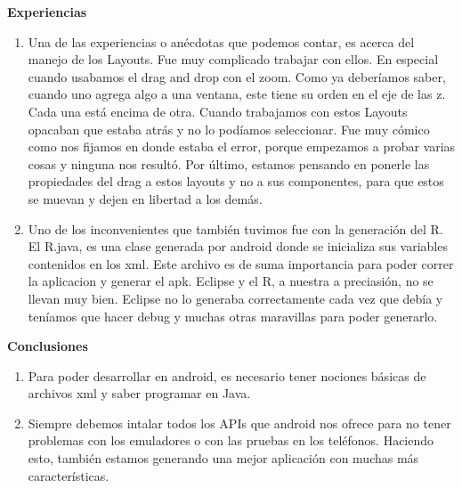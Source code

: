 \documentclass[12pt]{report}
\begin{document}
	\vspace{4em}
	
	\begingroup
		\large{
			\textbf{
				Experiencias
				\newline
				\newline
			}
		}
	\endgroup

		\begin{enumerate}[--]%
		\item Una de las experiencias o anécdotas que podemos contar, es acerca del manejo de los Layouts. Fue muy complicado trabajar con ellos. En especial cuando usabamos el drag and drop con el zoom. \newline
\newline Como ya deberíamos saber, cuando uno agrega algo a una ventana, este tiene su orden en el eje de las z. Cada una está encima de otra. Cuando trabajamos con estos Layouts opacaban que estaba atrás y no lo podíamos seleccionar. Fue muy cómico como nos fijamos en donde estaba el error, porque empezamos a probar varias cosas y ninguna nos resultó.
Por último, estamos pensando en ponerle las propiedades del drag a estos layouts y no a sus componentes, para que estos se muevan y dejen en libertad a los demás.
		\item Uno de los inconvenientes que también tuvimos fue con la generación del R. El R.java, es una clase generada por android donde se inicializa sus variables contenidos en los xml. Este archivo es de suma importancia para poder correr la aplicacion y generar el apk.
\newline Eclipse y el R, a nuestra a preciasión, no se llevan muy bien. Eclipse no lo generaba correctamente cada vez que debía y teníamos que hacer debug y muchas otras maravillas para poder generarlo.
		\end{enumerate}


	\vspace{4em}
	
	\begingroup
		\large{
			\textbf{
				Conclusiones
				\newline
				\newline
			}
		}
	\endgroup

		\begin{enumerate}[1]%
		\item Para poder desarrollar en android, es necesario tener nociones básicas de archivos xml y saber programar en Java. 
		\item Siempre debemos intalar todos los APIs que android nos ofrece para no tener problemas con los emuladores o con las pruebas en los teléfonos. Haciendo esto, también estamos generando una mejor aplicación con muchas más características.
		\end{enumerate}


	
\end{document}
